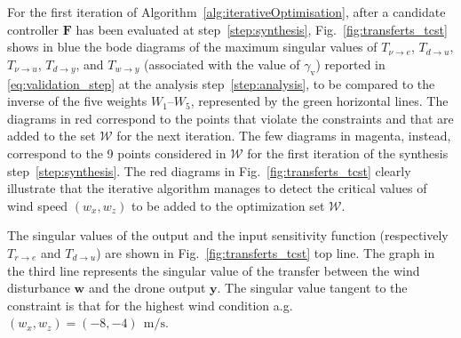 For the first iteration of Algorithm~\ref{alg:iterativeOptimisation}, after a candidate controller $\boldsymbol{F}$ has been evaluated at step~\ref{step:synthesis},
Fig.~\ref{fig:transferts_tcst} shows in blue the bode diagrams of the maximum singular values of $T_{\nu \rightarrow e}$, $T_{d \rightarrow u}$, 
$T_{\nu \rightarrow u}$, $T_{d \rightarrow y}$, and $T_{w \rightarrow y}$ (associated with the value of $\gamma_{\text{v}}$) 
reported in \eqref{eq:validation_step} at the analysis step~\ref{step:analysis}, to be compared to the inverse of the five weights $W_1$--$W_5$, represented by the green horizontal lines. The diagrams in red correspond to the points that violate the constraints and that are added to the set ${\mathcal W}$ for the next iteration. The few diagrams in magenta, instead, correspond to the 9 points considered in ${\mathcal W}$ for the first iteration of the synthesis step~\ref{step:synthesis}.
The red diagrams in Fig.~\ref{fig:transferts_tcst} clearly illustrate that the iterative algorithm manages to detect the critical values of wind speed $(w_x,w_z)$ to be added to the optimization set
 ${\mathcal W}$.


The singular values of the output and the input sensitivity function (respectively $T_{r \rightarrow e}$ and $T_{d \rightarrow u}$)  are shown in Fig.~\ref{fig:transferts_tcst} top line. The graph in the third line represents the singular value of the transfer between the wind disturbance $\boldsymbol{w}$ and the drone output $\boldsymbol{y}$. The singular value tangent to the constraint is that for the highest wind condition a.g.  $(w_x, w_z) = (-8,-4)~\SI{}{\meter\per\second}$.








